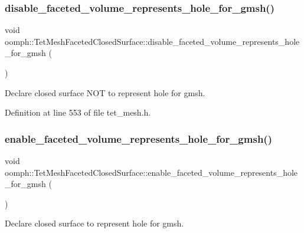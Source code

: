 \subsubsection{\texorpdfstring{disable\+\_\+faceted\+\_\+volume\+\_\+represents\+\_\+hole\+\_\+for\+\_\+gmsh()}{disable\_faceted\_volume\_represents\_hole\_for\_gmsh()}}
{\footnotesize\ttfamily void oomph\+::\+Tet\+Mesh\+Faceted\+Closed\+Surface\+::disable\+\_\+faceted\+\_\+volume\+\_\+represents\+\_\+hole\+\_\+for\+\_\+gmsh (\begin{DoxyParamCaption}{ }\end{DoxyParamCaption})\hspace{0.3cm}{\ttfamily [inline]}}



Declare closed surface N\+OT to represent hole for gmsh. 



Definition at line 553 of file tet\+\_\+mesh.\+h.

\mbox{\label{classoomph_1_1TetMeshFacetedClosedSurface_a3f8352fb0df78c37dafeaa94e0ccdce4}} 
\subsubsection{\texorpdfstring{enable\+\_\+faceted\+\_\+volume\+\_\+represents\+\_\+hole\+\_\+for\+\_\+gmsh()}{enable\_faceted\_volume\_represents\_hole\_for\_gmsh()}}
{\footnotesize\ttfamily void oomph\+::\+Tet\+Mesh\+Faceted\+Closed\+Surface\+::enable\+\_\+faceted\+\_\+volume\+\_\+represents\+\_\+hole\+\_\+for\+\_\+gmsh (\begin{DoxyParamCaption}{ }\end{DoxyParamCaption})\hspace{0.3cm}{\ttfamily [inline]}}



Declare closed surface to represent hole for gmsh. 



